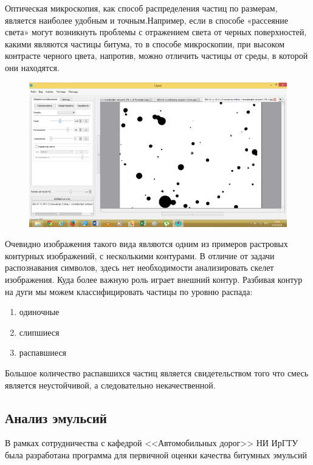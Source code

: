 Оптическая микроскопия, как способ распределения частиц по размерам, является наиболее удобным и точным.Например, если в способе «рассеяние света» могут возникнуть проблемы с отражением света от черных поверхностей, какими являются частицы битума, то в способе микроскопии, при высоком контрасте черного цвета, напротив, можно отличить частицы от среды, в которой они находятся.

\begin{figure}[h]
	\centering
	\includegraphics{images/em_00}
\end{figure}

Очевидно изображения такого вида являются одним из примеров растровых контурных изображений, с несколькими контурами. В отличие от задачи распознавания символов, здесь нет необходимости анализировать скелет изображения. Куда более важную роль играет внешний контур. Разбивая контур на дуги мы можем классифицировать частицы по уровню распада:
\begin{enumerate}
\item одиночные
\item слипшиеся
\item распавшиеся
\end{enumerate}
Большое количество распавшихся частиц является свидетельством того что смесь является неустойчивой, а следовательно некачественной.

\subsection{Анализ эмульсий}
В рамках сотрудничества с кафедрой <<Автомобильных дорог>> НИ ИрГТУ была разработана программа для первичной оценки качества битумных эмульсий

